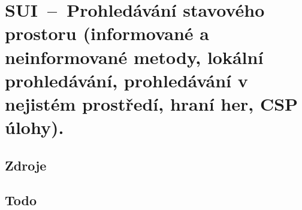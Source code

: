 

\graphicspath{{sui/prohledavani_stavoveho_prostoru/figures}}


\chapter{SUI~--~Prohledávání stavového prostoru (informované a neinformované metody, lokální prohledávání, prohledávání v nejistém prostředí, hraní her, CSP úlohy).}


\section{Zdroje}

\begin{compactitem}
    \item {}
\end{compactitem}


\section{Todo}
